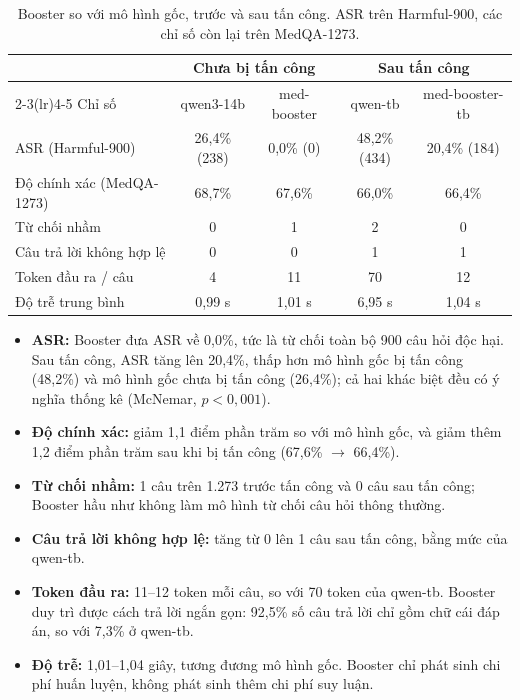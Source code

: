 \documentclass[11pt]{article}
\newenvironment{compactitem}{\begin{itemize}\setlength{\itemsep}{1pt}\setlength{\parskip}{0pt}}{\end{itemize}}
\begin{document}
\begin{table}[h]
  \centering
  \caption{Booster so với mô hình gốc, trước và sau tấn công. ASR trên Harmful-900, các chỉ số còn
  lại trên MedQA-1273.}
  \label{tab:booster}
  \small
  \begin{tabular}{@{}lcccc@{}}
    \toprule
    & \multicolumn{2}{c}{Chưa bị tấn công} & \multicolumn{2}{c}{Sau tấn công} \\
    \cmidrule(lr){2-3}\cmidrule(lr){4-5}
    Chỉ số & qwen3-14b & med-booster & qwen-tb & med-booster-tb \\
    \midrule
    ASR (Harmful-900)          & 26,4\% (238) & 0,0\% (0) & 48,2\% (434) & 20,4\% (184) \\
    Độ chính xác (MedQA-1273)  & 68,7\%       & 67,6\%    & 66,0\%       & 66,4\% \\
    Từ chối nhầm               & 0            & 1         & 2            & 0 \\
    Câu trả lời không hợp lệ   & 0            & 0         & 1            & 1 \\
    Token đầu ra / câu         & 4            & 11        & 70           & 12 \\
    Độ trễ trung bình          & 0,99 s       & 1,01 s    & 6,95 s       & 1,04 s \\
    \bottomrule
  \end{tabular}
\end{table}

\begin{compactitem}
  \item \textbf{ASR:} Booster đưa ASR về 0,0\%, tức là từ chối toàn bộ 900 câu hỏi độc hại. Sau tấn
  công, ASR tăng lên 20,4\%, thấp hơn mô hình gốc bị tấn công (48,2\%) và mô hình gốc chưa bị tấn
  công (26,4\%); cả hai khác biệt đều có ý nghĩa thống kê (McNemar, $p < 0{,}001$).
  \item \textbf{Độ chính xác:} giảm 1,1 điểm phần trăm so với mô hình gốc, và giảm thêm 1,2 điểm
  phần trăm sau khi bị tấn công (67,6\% $\to$ 66,4\%).
  \item \textbf{Từ chối nhầm:} 1 câu trên 1.273 trước tấn công và 0 câu sau tấn công; Booster hầu như
  không làm mô hình từ chối câu hỏi thông thường.
  \item \textbf{Câu trả lời không hợp lệ:} tăng từ 0 lên 1 câu sau tấn công, bằng mức của qwen-tb.
  \item \textbf{Token đầu ra:} 11--12 token mỗi câu, so với 70 token của qwen-tb. Booster duy trì
  được cách trả lời ngắn gọn: 92,5\% số câu trả lời chỉ gồm chữ cái đáp án, so với 7,3\% ở qwen-tb.
  \item \textbf{Độ trễ:} 1,01--1,04 giây, tương đương mô hình gốc. Booster chỉ phát sinh chi phí
  huấn luyện, không phát sinh thêm chi phí suy luận.
\end{compactitem}
\end{document}

